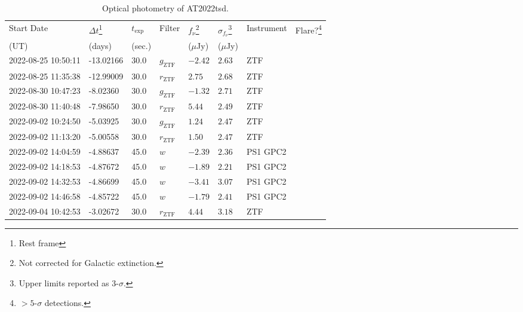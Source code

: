 \documentclass{nature_plusfigure}
\begin{document}
\clearpage

\begin{supplement}

\renewcommand{\thefigure}{Supplementary Information Figure~\arabic{figure}}
\renewcommand{\figurename}{}
\setcounter{figure}{0}
%


\renewcommand{\thetable}{Supplementary Information Table~\arabic{table}}
 \renewcommand{\tablename}{}
\setcounter{table}{0}

\begin{center} 
\begin{longtable}{llllllll} 
\caption{Optical photometry of AT2022tsd.} 
\label{tab:optical-photometry}\\ 
\hline\hline
Start Date & $\Delta t$\footnote{Rest frame} & $t_\mathrm{exp}$ & Filter & $f_\nu$\footnote{Not corrected for Galactic extinction.} & $\sigma_{f_\nu}$\footnote{Upper limits reported as 3-$\sigma$.} & Instrument & Flare?\footnote{$>5$-$\sigma$ detections.}\\ 
(UT) & (days) & (sec.) &  & ($\mu$Jy) & ($\mu$Jy) &  & \\ 
\hline
2022-08-25 10:50:11 & -13.02166 & 30.0 & ${g}_\mathrm{ZTF}$ & $-2.42$ & $2.63$ & ZTF &  \\ 
2022-08-25 11:35:38 & -12.99009 & 30.0 & ${r}_\mathrm{ZTF}$ & $2.75$ & $2.68$ & ZTF &  \\ 
2022-08-30 10:47:23 & -8.02360 & 30.0 & ${g}_\mathrm{ZTF}$ & $-1.32$ & $2.71$ & ZTF &  \\ 
2022-08-30 11:40:48 & -7.98650 & 30.0 & ${r}_\mathrm{ZTF}$ & $5.44$ & $2.49$ & ZTF &  \\ 
2022-09-02 10:24:50 & -5.03925 & 30.0 & ${g}_\mathrm{ZTF}$ & $1.24$ & $2.47$ & ZTF &  \\ 
2022-09-02 11:13:20 & -5.00558 & 30.0 & ${r}_\mathrm{ZTF}$ & $1.50$ & $2.47$ & ZTF &  \\ 
2022-09-02 14:04:59 & -4.88637 & 45.0 & $w$ & $-2.39$ & $2.36$ & PS1 GPC2 &  \\ 
2022-09-02 14:18:53 & -4.87672 & 45.0 & $w$ & $-1.89$ & $2.21$ & PS1 GPC2 &  \\ 
2022-09-02 14:32:53 & -4.86699 & 45.0 & $w$ & $-3.41$ & $3.07$ & PS1 GPC2 &  \\ 
2022-09-02 14:46:58 & -4.85722 & 45.0 & $w$ & $-1.79$ & $2.41$ & PS1 GPC2 &  \\ 
2022-09-04 10:42:53 & -3.02672 & 30.0 & ${r}_\mathrm{ZTF}$ & $4.44$ & $3.18$ & ZTF &  \\ 

\end{longtable}
\end{center}
\end{supplement}
\end{document}
